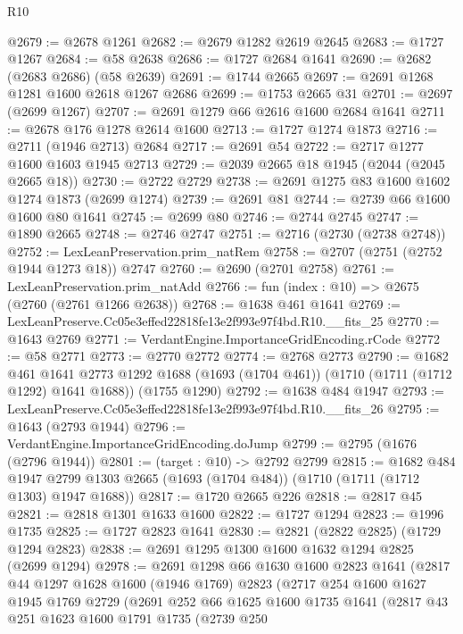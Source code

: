 \begin{lexlean}{R10}
\begin{coremodule}
@2679 := @2678 @1261
@2682 := @2679 @1282 @2619 @2645
@2683 := @1727 @1267
@2684 := @58 @2638
@2686 := @1727 @2684 @1641
@2690 := @2682 (@2683 @2686) (@58 @2639)
@2691 := @1744 @2665
@2697 := @2691 @1268 @1281 @1600 @2618 @1267 @2686
@2699 := @1753 @2665 @31
@2701 := @2697 (@2699 @1267)
@2707 := @2691 @1279 @66 @2616 @1600 @2684 @1641
@2711 := @2678 @176 @1278 @2614 @1600
@2713 := @1727 @1274 @1873
@2716 := @2711 (@1946 @2713) @2684
@2717 := @2691 @54
@2722 := @2717 @1277 @1600 @1603 @1945 @2713
@2729 := @2039 @2665 @18 @1945 (@2044 (@2045 @2665 @18))
@2730 := @2722 @2729
@2738 := @2691 @1275 @83 @1600 @1602 @1274 @1873 (@2699 @1274)
@2739 := @2691 @81
@2744 := @2739 @66 @1600 @1600 @80 @1641
@2745 := @2699 @80
@2746 := @2744 @2745
@2747 := @1890 @2665
@2748 := @2746 @2747
@2751 := @2716 (@2730 (@2738 @2748))
@2752 := LexLeanPreservation.prim_natRem
@2758 := @2707 (@2751 (@2752 @1944 @1273 @18)) @2747
@2760 := @2690 (@2701 @2758)
@2761 := LexLeanPreservation.prim_natAdd
@2766 := fun (index : @10) => @2675 (@2760 (@2761 @1266 @2638))
@2768 := @1638 @461 @1641
@2769 := LexLeanPreserve.Cc05e3effed22818fe13e2f993e97f4bd.R10.__fits_25
@2770 := @1643 @2769
@2771 := VerdantEngine.ImportanceGridEncoding.rCode
@2772 := @58 @2771
@2773 := @2770 @2772
@2774 := @2768 @2773
@2790 := @1682
    @461
    @1641
    @2773
    @1292
    @1688
    (@1693 (@1704 @461))
    (@1710 (@1711 (@1712 @1292) @1641 @1688))
    (@1755 @1290)
@2792 := @1638 @484 @1947
@2793 := LexLeanPreserve.Cc05e3effed22818fe13e2f993e97f4bd.R10.__fits_26
@2795 := @1643 (@2793 @1944)
@2796 := VerdantEngine.ImportanceGridEncoding.doJump
@2799 := @2795 (@1676 (@2796 @1944))
@2801 := (target : @10) -> @2792 @2799
@2815 := @1682
    @484
    @1947
    @2799
    @1303
    @2665
    (@1693 (@1704 @484))
    (@1710 (@1711 (@1712 @1303) @1947 @1688))
@2817 := @1720 @2665 @226
@2818 := @2817 @45
@2821 := @2818 @1301 @1633 @1600
@2822 := @1727 @1294
@2823 := @1996 @1735
@2825 := @1727 @2823 @1641
@2830 := @2821 (@2822 @2825) (@1729 @1294 @2823)
@2838 := @2691 @1295 @1300 @1600 @1632 @1294 @2825 (@2699 @1294)
@2978 := @2691
    @1298
    @66
    @1630
    @1600
    @2823
    @1641
    (@2817
      @44
      @1297
      @1628
      @1600
      (@1946 @1769)
      @2823
      (@2717
        @254
        @1600
        @1627
        @1945
        @1769
        @2729
        (@2691
          @252
          @66
          @1625
          @1600
          @1735
          @1641
          (@2817
            @43
            @251
            @1623
            @1600
            @1791
            @1735
            (@2739
              @250

\end{coremodule}
\end{lexlean}

